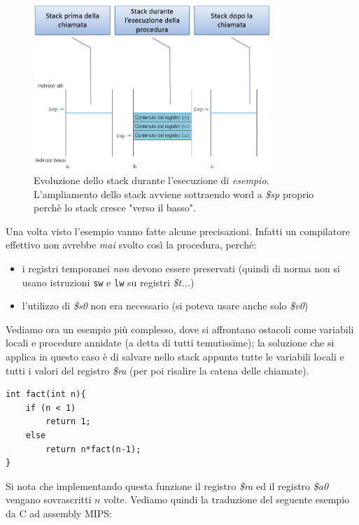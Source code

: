 \documentclass[class=book, crop=false]{standalone}
\begin{document}
\begin{figure}[H]
	\centering
	\caption{Evoluzione dello stack durante l'esecuzione di \emph{esempio}. L'ampliamento dello stack avviene sottraendo word a \emph{\$sp} proprio perchè lo stack cresce "verso il basso".}
	\includegraphics[width=0.8\textwidth,keepaspectratio]{Evoluzione-stack}
\end{figure}

Una volta visto l'esempio vanno fatte alcune precisazioni. Infatti un compilatore effettivo non avrebbe \emph{mai} svolto così la procedura, perché:
\begin{itemize}
	\item i registri temporanei \emph{non} devono essere preservati (quindi di norma non si usano istruzioni \texttt{sw} e \texttt{lw} su registri \emph{\$t...})
	\item l'utilizzo di \emph{\$s0} non era necessario (si poteva usare anche solo \emph{\$v0})
\end{itemize}

Vediamo ora un esempio più complesso, dove si affrontano ostacoli come variabili locali e procedure annidate (a detta di tutti temutissime); la soluzione che si applica in questo caso è di salvare nello stack appunto tutte le variabili locali e tutti i valori del registro \emph{\$ra} (per poi risalire la catena delle chiamate).

\begin{verbatim}
int fact(int n){
	if (n < 1)
		return 1;
	else
		return n*fact(n-1);
}
\end{verbatim}

Si nota che implementando questa funzione il registro \emph{\$ra} ed il registro \emph{\$a0} vengano sovrascritti $n$ volte.
Vediamo quindi la traduzione del seguente esempio da C ad assembly MIPS:
\end{document}
